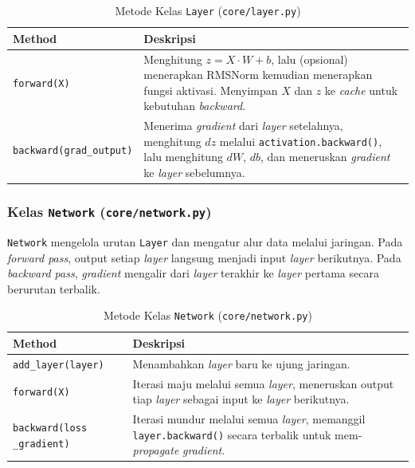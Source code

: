 \begin{table}[H]
    \centering
    \caption{Metode Kelas \texttt{Layer} (\texttt{core/layer.py})}
    \begin{tabular}{p{3.5cm}p{10cm}}
        \toprule
        \textbf{Method} & \textbf{Deskripsi} \\
        \midrule
        \texttt{forward(X)} & Menghitung $z = X \cdot W + b$, lalu (opsional) menerapkan RMSNorm kemudian menerapkan fungsi aktivasi. Menyimpan $X$ dan $z$ ke \textit{cache} untuk kebutuhan \textit{backward}. \\[4pt]
        \texttt{backward(grad\_output)} & Menerima \textit{gradient} dari \textit{layer} setelahnya, menghitung $dz$ melalui \texttt{activation.backward()}, lalu menghitung $dW$, $db$, dan meneruskan \textit{gradient} ke \textit{layer} sebelumnya. \\
        \bottomrule
    \end{tabular}
    \label{tab:layer-method}
\end{table}

\subsubsection{Kelas \texttt{Network} (\texttt{core/network.py})}

\texttt{Network} mengelola urutan \texttt{Layer} dan mengatur alur data melalui jaringan. Pada \textit{forward pass}, output setiap \textit{layer} langsung menjadi input \textit{layer} berikutnya. Pada \textit{backward pass}, \textit{gradient} mengalir dari \textit{layer} terakhir ke \textit{layer} pertama secara berurutan terbalik.

\begin{table}[H]
    \centering
    \caption{Metode Kelas \texttt{Network} (\texttt{core/network.py})}
    \begin{tabular}{p{3.5cm}p{10cm}}
        \toprule
        \textbf{Method} & \textbf{Deskripsi} \\
        \midrule
        \texttt{add\_layer(layer)} & Menambahkan \textit{layer} baru ke ujung jaringan. \\[4pt]
        \texttt{forward(X)} & Iterasi maju melalui semua \textit{layer}, meneruskan output tiap \textit{layer} sebagai input ke \textit{layer} berikutnya. \\[4pt]
        \texttt{backward(loss \_gradient)} & Iterasi mundur melalui semua \textit{layer}, memanggil \texttt{layer.backward()} secara terbalik untuk mem-\textit{propagate} \textit{gradient}. \\
        \bottomrule
    \end{tabular}
    \label{tab:network-method}
\end{table}

